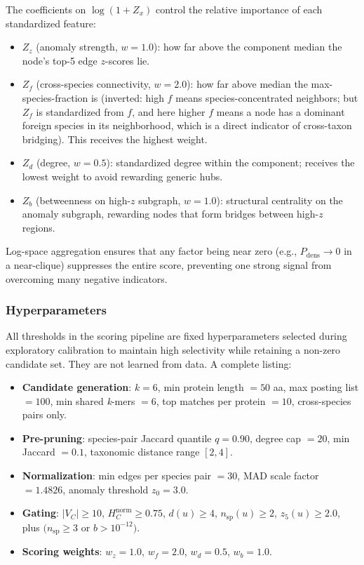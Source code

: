 \documentclass[11pt]{article}
\begin{document}
The coefficients on $\log(1+Z_x)$ control the relative importance of each standardized feature:
\begin{itemize}[noitemsep]
    \item $Z_z$ (anomaly strength, $w=1.0$): how far above the component median the node's top-5 edge $z$-scores lie.
    \item $Z_f$ (cross-species connectivity, $w=2.0$): how far above median the max-species-fraction is (inverted: high $f$ means species-concentrated neighbors; but $Z_f$ is standardized from $f$, and here higher $f$ means a node has a dominant foreign species in its neighborhood, which is a direct indicator of cross-taxon bridging). This receives the highest weight.
    \item $Z_d$ (degree, $w=0.5$): standardized degree within the component; receives the lowest weight to avoid rewarding generic hubs.
    \item $Z_b$ (betweenness on high-$z$ subgraph, $w=1.0$): structural centrality on the anomaly subgraph, rewarding nodes that form bridges between high-$z$ regions.
\end{itemize}

Log-space aggregation ensures that any factor being near zero (e.g., $P_{\mathrm{dens}} \to 0$ in a near-clique) suppresses the entire score, preventing one strong signal from overcoming many negative indicators.

\subsubsection{Hyperparameters}
\label{subsubsec:hyperparams}

All thresholds in the scoring pipeline are fixed hyperparameters selected during exploratory calibration to maintain high selectivity while retaining a non-zero candidate set. They are not learned from data. A complete listing:

\begin{itemize}[noitemsep]
    \item \textbf{Candidate generation}: $k=6$, min protein length $=50$ aa, max posting list $=100$, min shared \textit{k}-mers $=6$, top matches per protein $=10$, cross-species pairs only.
    \item \textbf{Pre-pruning}: species-pair Jaccard quantile $q=0.90$, degree cap $=20$, min Jaccard $=0.1$, taxonomic distance range $[2,4]$.
    \item \textbf{Normalization}: min edges per species pair $=30$, MAD scale factor $=1.4826$, anomaly threshold $z_0=3.0$.
    \item \textbf{Gating}: $|V_C| \ge 10$, $H_C^{\mathrm{norm}} \ge 0.75$, $d(u) \ge 4$, $n_{\mathrm{sp}}(u) \ge 2$, $z_5(u) \ge 2.0$, plus $(n_{\mathrm{sp}} \ge 3$ or $b > 10^{-12})$.
    \item \textbf{Scoring weights}: $w_z = 1.0$, $w_f = 2.0$, $w_d = 0.5$, $w_b = 1.0$.
\end{itemize}
\end{document}
